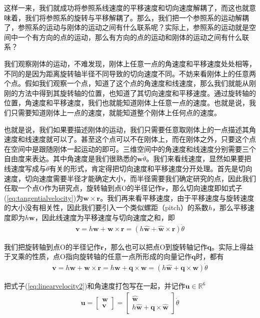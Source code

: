 \documentclass[12pt, a4paper, article, UTF8]{ctexart}
\begin{document}
这样一来，我们就成功将参照系线速度的平移速度和切向速度解耦了，而这也就意味着，我们将参照系的旋转与平移解耦了。那么，我们把一个参照系的运动解耦了，参照系的运动与刚体的运动之间有什么联系呢？实际上，参照系的运动就是空间中一个有方向的点的运动，那么有方向的点的运动和刚体的运动之间有什么联系？

我们观察刚体的运动，不难发现，刚体上任意一点的角速度和平移速度处处相等，不同的是因为距离旋转轴半径不同导致的切向速度不同。不妨来看刚体上的任意两个点。假如我们观察一个点，知道了这个点的角速度和线速度，那么我们就能从刚刚的方法中得到其旋转轴的位置，也知道了其切向速度和平移速度。通过旋转轴的位置，角速度和平移速度，我们也就能知道刚体上任意一点的速度。也就是说，我们只需要知道刚体上一点的速度，就能知道整个刚体上任何点的速度。

也就是说，我们如果要描述刚体的运动，我们只需要任意取刚体上的一点描述其角速度和线速度就可以了。甚至这个点可以不在刚体上，而在刚体之外，只要这个点在空间中是跟随刚体一起运动的即可。三维空间中的角速度和线速度分别需要三个自由度来表达。其中角速度是我们很熟悉的$\mathbf{w}\dot{\theta}$。我们来看线速度，显然如果要把线速度写成与$\dot{\theta}$有关的形式，肯定得把切向速度和平移速度分开处理。首先是切向速度，切向速度需要半径才能确定大小，而半径需要我们确定研究的点，因此我们任取一个点O作为研究点，旋转轴到点O的半径记作$\mathbf{r}$，那么切向速度即如式子(\ref{eq:tangentialvelocity})为$\mathbf{w}\times \mathbf{r}$。我们再来看平移速度，由于平移速度与旋转速度的大小没有相关性，因此我们要引入一个类似螺距（pitch）的系数$h$，那么平移速度即为$h\mathbf{w}$，因此线速度为平移速度与切向速度之和，即
\begin{align}
\mathbf{v} = h\mathbf{w} +  \mathbf{w}\times \mathbf{r} = (h\hat{\mathbf{w}} + \hat{\mathbf{w}} \times \mathbf{r}) \dot{\theta} \label{eq:linearvelocity}
\end{align}

我们把旋转轴到点O的半径记作$\mathbf{r}$，那么也可以把点O到旋转轴记作$\mathbf{q}$。实际上得益于叉乘的性质，点O指向旋转轴的任意一点所形成的向量记作$\mathbf{q}$时，都有
\begin{align}
\mathbf{v} = h\mathbf{w} +  \mathbf{w}\times \mathbf{r} = h\mathbf{w} +  \mathbf{q} \times \mathbf{w} = (h\hat{\mathbf{w}} +\mathbf{q} \times \hat{  \mathbf{w}}) \dot{\theta} \label{eq:linearvelocity2}
\end{align}

把式子(\ref{eq:linearvelocity2})和角速度打包写在一起，并记作$\mathbf{u}
\in\mathbb{R}^6$  
\begin{align}
\mathbf{u} = \begin{bmatrix}
\mathbf{w} \\ \mathbf{v} 
\end{bmatrix} = \begin{bmatrix}
\hat{\mathbf{w}} \\  h\hat{\mathbf{w}} + \mathbf{q}\times \hat{\mathbf{w}} 
\end{bmatrix} \dot{\theta} \label{eq:screwrepresentation}
\end{align}
\end{document}
